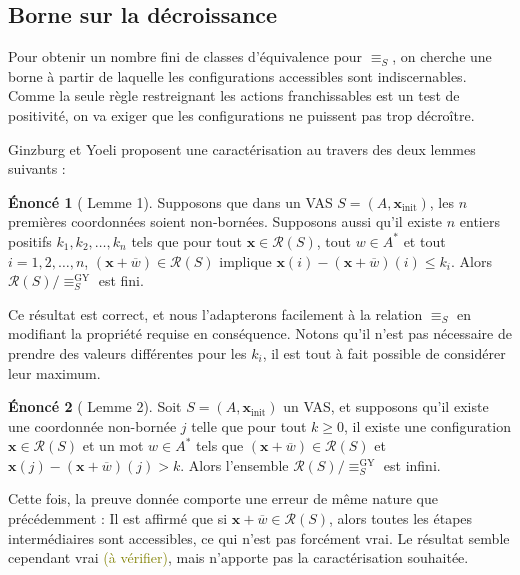 \documentclass[a4paper,final]{article}
\theoremstyle{definition}
\newtheorem*{Statement}{Énoncé}
\let\leq\leqslant
\let\geq\geqslant
\newcommand{\lucas}[1]{\textcolor{olive}{#1}}
\newcommand{\lang}{\ensuremath{\mathcal{L}}}
\newcommand{\reach}{\ensuremath{\mathcal{R}}}
\newcommand{\vect}[1]{\ensuremath{\mathbf{#1}}}
\newcommand{\rel}{\ensuremath{\equiv}}
\newcommand{\relGY}{\ensuremath{\equiv^\text{GY}_S}}
\newcommand{\xinit}{\ensuremath{\vect{x}_\text{init}}}
\newcommand{\valeur}[1]{\ensuremath{\overline{#1}}}
\begin{document}

\subsection{Borne sur la décroissance}

Pour obtenir un nombre fini de classes d'équivalence pour $\rel_S$, on cherche une borne à partir de laquelle les configurations accessibles sont indiscernables.
Comme la seule règle restreignant les actions franchissables est un test de positivité, on va exiger que les configurations ne puissent pas trop décroître.

Ginzburg et Yoeli proposent une caractérisation au travers des deux lemmes suivants :


\begin{Statement}[\cite{giyo80} Lemme 1]
    Supposons que dans un VAS $S=(A,\xinit)$, les $n$ premières coordonnées soient non-bornées.
    Supposons aussi qu'il existe $n$ entiers positifs $k_1,k_2,\dots,k_n$ tels que pour tout $\vect{x}\in\reach(S)$, tout $w\in A^\ast$ et tout $i=1,2,\dots,n$, 
    $(\vect{x} +\valeur{w})\in\reach(S)$ implique
    $\vect{x}(i) - (\vect{x} +\valeur{w})(i) \leq k_i$.
    Alors $\reach(S)/\relGY$ est fini.
\end{Statement}

Ce résultat est correct, et nous l'adapterons facilement à la relation $\rel_S$ en modifiant la propriété requise en conséquence.
Notons qu'il n'est pas nécessaire de prendre des valeurs différentes pour les $k_i$, il est tout à fait possible de considérer leur maximum.

\begin{Statement}[\cite{giyo80} Lemme 2]
    Soit $S=(A,\xinit)$ un VAS, et supposons qu'il existe une coordonnée non-bornée $j$ telle que 
    pour tout $k\geq 0$, il existe une configuration $\vect{x}\in\reach(S)$ et un mot $w\in A^\ast$ tels que 
    $(\vect{x} +\valeur{w}) \in\reach(S)$ et $\vect{x}(j) - (\vect{x} +\valeur{w})(j) > k$.
    Alors l'ensemble $\reach(S)/\relGY$ est infini.
\end{Statement}

Cette fois, la preuve donnée comporte une erreur de même nature que précédemment :
Il est affirmé que si $\vect{x} +\valeur{w} \in\reach(S)$, alors toutes les étapes intermédiaires sont accessibles, ce qui n'est pas forcément vrai.
Le résultat semble cependant vrai \lucas{(à vérifier)}, mais n'apporte pas la caractérisation souhaitée.
\end{document}
